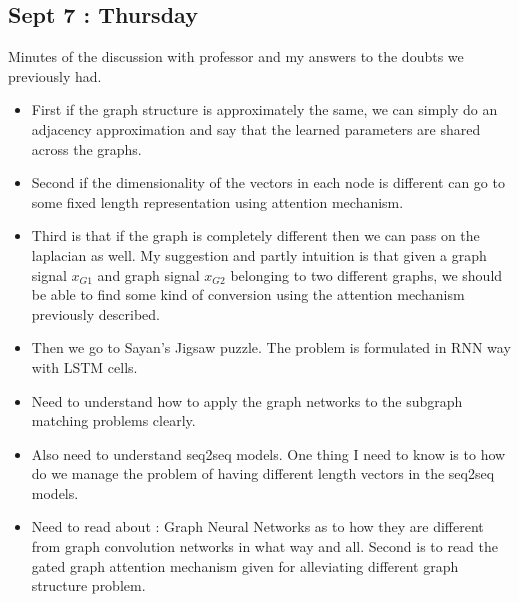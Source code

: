 \documentclass{article}
\begin{document}
\subsection{Sept 7 : Thursday}
Minutes of the discussion with professor and my answers to the doubts we previously had.
\begin{itemize}
\item First if the graph structure is approximately the same, we can simply do an adjacency approximation and say that the learned parameters are shared across the graphs.
\item Second if the dimensionality of the vectors in each node is different can go to some fixed length representation using attention mechanism.
\item Third is that if the graph is completely different then we can pass on the laplacian as well. My suggestion and partly intuition is that given a graph signal $x_{G1}$ and graph signal $x_{G2}$ belonging to two different graphs, we should be able to find some kind of conversion using the attention mechanism previously described.
\item Then we go to Sayan's Jigsaw puzzle. The problem is formulated in RNN way with LSTM cells.
\item Need to understand how to apply the graph networks to the subgraph matching problems clearly.
\item Also need to understand seq2seq models. One thing I need to know is to how do we manage the problem of having different length vectors in the seq2seq models.
\item Need to read about : Graph Neural Networks as to how they are different from graph convolution networks in what way and all. Second is to read the gated graph attention mechanism given for alleviating different graph structure problem.
\end{itemize}




\end{document}
